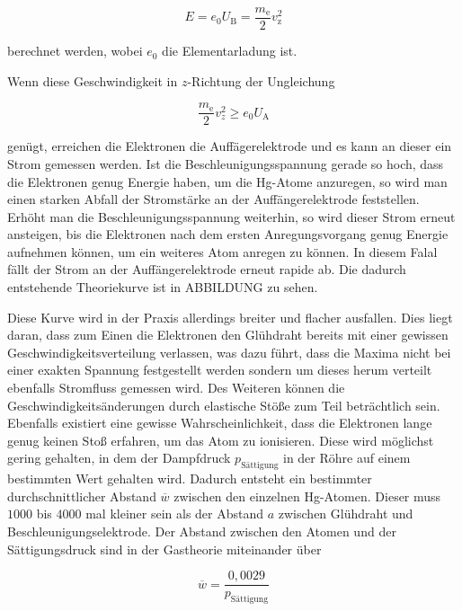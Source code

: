 \begin{equation}
    \label{eqn:eU}
    E = e_0 U_\text{B} = \frac{m_\text{e}}{2} v_\text{z}^2
\end{equation}

berechnet werden, wobei $e_0$ die Elementarladung ist.

Wenn diese Geschwindigkeit in $z$-Richtung der Ungleichung

\begin{equation}
    \label{eqn:min-vel}
    \frac{m_\text{e}}{2} v_z^2 \geq e_0 U_\text{A}
\end{equation}

genügt, erreichen die Elektronen die Auffägerelektrode und es kann an dieser ein Strom gemessen werden.
Ist die Beschleunigungsspannung gerade so hoch, dass die Elektronen genug Energie haben, um die Hg-Atome anzuregen, so wird man einen starken Abfall der Stromstärke an der Auffängerelektrode feststellen.
Erhöht man die Beschleunigungsspannung weiterhin, so wird dieser Strom erneut ansteigen, bis die Elektronen nach dem ersten Anregungsvorgang genug Energie aufnehmen können, um ein weiteres Atom anregen zu können.
In diesem Falal fällt der Strom an der Auffängerelektrode erneut rapide ab.
Die dadurch entstehende Theoriekurve ist in ABBILDUNG zu sehen.

Diese Kurve wird in der Praxis allerdings breiter und flacher ausfallen.
Dies liegt daran, dass zum Einen die Elektronen den Glühdraht bereits mit einer gewissen Geschwindigkeitsverteilung verlassen, was dazu führt, dass die Maxima nicht bei einer exakten Spannung festgestellt werden sondern um dieses herum verteilt ebenfalls Stromfluss gemessen wird.
Des Weiteren können die Geschwindigkeitsänderungen durch elastische Stöße zum Teil beträchtlich sein.
Ebenfalls existiert eine gewisse Wahrscheinlichkeit, dass die Elektronen lange genug keinen Stoß erfahren, um das Atom zu ionisieren.
Diese wird möglichst gering gehalten, in dem der Dampfdruck $p_\text{Sättigung}$ in der Röhre auf einem bestimmten Wert gehalten wird. Dadurch entsteht ein bestimmter durchschnittlicher Abstand $\overline{w}$ zwischen den einzelnen Hg-Atomen.
Dieser muss $1000$ bis $4000$ mal kleiner sein als der Abstand $a$ zwischen Glühdraht und Beschleunigungselektrode. Der Abstand zwischen den Atomen und der Sättigungsdruck sind in der Gastheorie miteinander über

\begin{equation}
    \label{eqn:druck-abstand}
    \overline{w} = \frac{0,0029}{p_\text{Sättigung}}
\end{equation}

